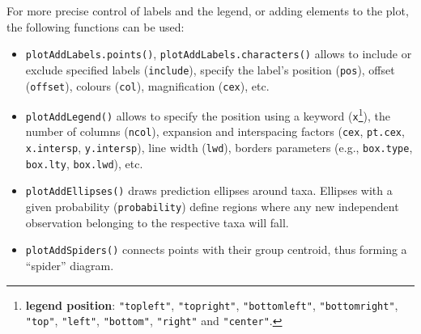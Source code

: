 \documentclass[
]{article}
\begin{document}
For more precise control of labels and the legend, or adding elements to
the plot, the following functions can be used:

\begin{itemize}
\item
  \texttt{plotAddLabels.points()}, \texttt{plotAddLabels.characters()}
  allows to include or exclude specified labels (\texttt{include}),
  specify the label's position (\texttt{pos}), offset (\texttt{offset}),
  colours (\texttt{col}), magnification (\texttt{cex}), etc.
\item
  \texttt{plotAddLegend()} allows to specify the position using a
  keyword (\texttt{x}\footnote{\textbf{legend position}:
    \texttt{"topleft"}, \texttt{"topright"}, \texttt{"bottomleft"},
    \texttt{"bottomright"}, \texttt{"top"}, \texttt{"left"},
    \texttt{"bottom"}, \texttt{"right"} and \texttt{"center"}.}), the
  number of columns (\texttt{ncol}), expansion and interspacing factors
  (\texttt{cex}, \texttt{pt.cex}, \texttt{x.intersp},
  \texttt{y.intersp}), line width (\texttt{lwd}), borders parameters
  (e.g., \texttt{box.type}, \texttt{box.lty}, \texttt{box.lwd}), etc.
\item
  \texttt{plotAddEllipses()} draws prediction ellipses around taxa.
  Ellipses with a given probability (\texttt{probability}) define
  regions where any new independent observation belonging to the
  respective taxa will fall.
\item
  \texttt{plotAddSpiders()} connects points with their group centroid,
  thus forming a ``spider'' diagram.
\end{itemize}
\end{document}
